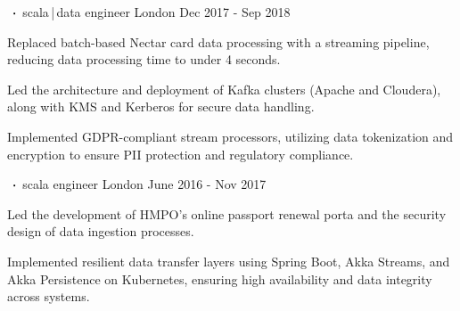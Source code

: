 \begin{cventries}
    \cventry
    {      }
    {$\sqbig$scala\,|\,data engineer}
    {London}
    {Dec 2017 - Sep 2018}
    {}
    {
        \begin{cvitems}
            \item{Replaced batch-based Nectar card data processing with a streaming pipeline, reducing data processing time to under 4 seconds.}
            \item{Led the architecture and deployment of Kafka clusters (Apache and Cloudera), along with KMS and Kerberos for secure data handling.}
            \item{Implemented GDPR-compliant stream processors, utilizing data tokenization and encryption to ensure PII protection and regulatory compliance.}
        \end{cvitems}
    }

    \cventry
    {      }
    {$\sqbig$scala engineer}
    {London}
    {June 2016 - Nov 2017}
    {}
    {
        \begin{cvitems}
            \item{Led the development of HMPO’s online passport renewal porta and the security design of data ingestion processes.}
            \item{Implemented resilient data transfer layers using Spring Boot, Akka Streams, and Akka Persistence on Kubernetes, ensuring high availability and data integrity across systems.}
        \end{cvitems}
    }


\end{cventries}
